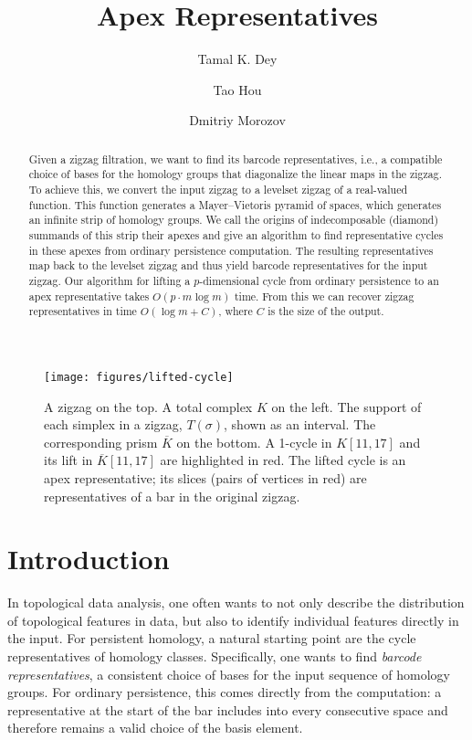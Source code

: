 \documentclass[cleveref,a4paper,english,nolineno]{socg-lipics-v2021}
\title{Apex Representatives}
\author{Tamal K. Dey}
{Purdue University}
{tamaldey@purdue.edu}{https://orcid.org/0000-0001-5160-9738}{}
\author{Tao Hou}
{University of Oregon}
{taohou@uoregon.edu}{https://orcid.org/0000-0002-3389-6136}{}
\author{Dmitriy Morozov}
{Lawrence Berkeley National Laboratory}
{dmitriy@mrzv.org}{https://orcid.org/0000-0002-4330-6670}{}
\newcommand{\prism}[1]{\overline{#1}}
\newcommand{\pK}{\prism{K}}
\newcommand{\ssx}{\sigma}
\begin{document}
\maketitle

\begin{abstract}
    Given a zigzag filtration, we want to find its barcode representatives,
    i.e., a compatible choice of bases for the homology groups that diagonalize
    the linear maps in the zigzag.  To achieve this, we convert the input zigzag
    to a levelset zigzag of a real-valued function. This function generates a
    Mayer--Vietoris pyramid of spaces, which generates an infinite strip of
    homology groups. We call the origins of indecomposable (diamond) summands of
    this strip their apexes and give an algorithm to find representative cycles
    in these apexes from ordinary persistence computation. The resulting
    representatives map back to the levelset zigzag and thus yield barcode
    representatives for the input zigzag. Our algorithm for lifting a
    $p$-dimensional cycle from ordinary persistence to an apex representative
    takes $O(p \cdot m \log m)$ time.
    From this we can recover zigzag representatives in time $O(\log m + C)$,
    where $C$ is the size of the output.
\end{abstract}

\vspace{-1ex}
\begin{figure}[htbp]
    \centering
    \texttt{[image: figures/lifted-cycle]}
    \caption{A zigzag on the top. A total complex $K$ on the left. The support of each simplex in a zigzag,
             $T(\ssx)$, shown as an interval. The corresponding prism $\pK$ on
             the bottom.  A 1-cycle in $K[11,17]$ and its lift in $\pK[11,17]$ are
             highlighted in red. The lifted cycle is an apex representative; its
             slices (pairs of vertices in red) are representatives of a bar in the original zigzag.}
    \label{fig:lifted-cycle}
\end{figure}

\section{Introduction}

In topological data analysis, one often wants to not only describe the
distribution of topological features in data, but also to identify individual
features directly in the input. For persistent homology, a natural starting point
are the cycle representatives of homology classes. Specifically, one wants to
find \emph{barcode representatives}, a consistent choice of bases for the
input sequence of homology groups.  For ordinary persistence, this comes
directly from the computation: a representative at the start of the bar includes
into every consecutive space and therefore remains a valid choice of the basis
element.
\end{document}
